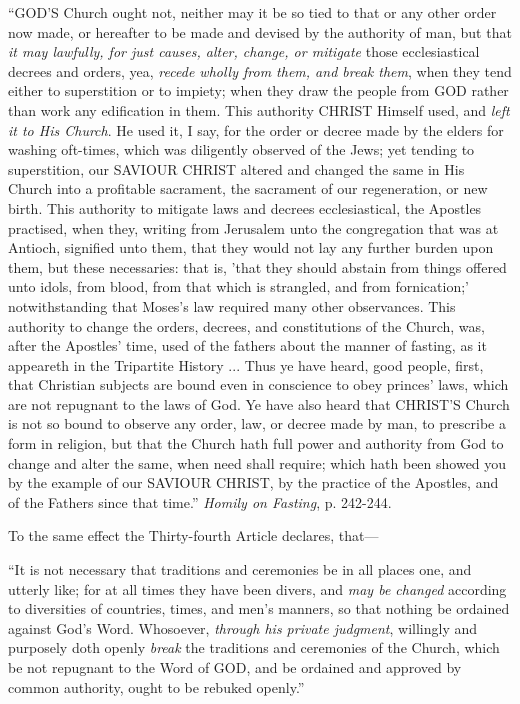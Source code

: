``GOD'S
Church ought not, neither may it be so tied to that or any other order
now made, or hereafter to be made and devised by the authority of man,
but that \emph{it may lawfully, for just causes, alter, change, or
mitigate} those ecclesiastical decrees and orders, yea, \emph{recede
wholly from them, and break them}, when they tend either to
superstition or to impiety; when they draw the people from GOD
rather than work any edification in them. This authority CHRIST
Himself used, and \emph{left it to His Church}. He used it, I say, for
the order or decree made by the elders for washing oft-times, which
was diligently observed of the Jews; yet tending to superstition, our
SAVIOUR CHRIST
altered and changed the same in His Church into a profitable
sacrament, the sacrament of our regeneration, or new birth. This
authority to mitigate laws and decrees ecclesiastical, the Apostles
practised, when they, writing from Jerusalem unto the congregation
that was at Antioch, signified unto them, that they would not lay any
further burden upon them, but these necessaries: that is, 'that they
should abstain from things offered unto idols, from blood, from that
which is strangled, and from fornication;' notwithstanding that Moses's
law required many other observances. This authority to change the
orders, decrees, and constitutions of the Church, was, after the
Apostles' time, used of the fathers about the manner of fasting, as it
appeareth in the Tripartite History ... Thus ye have heard, good
people, first, that Christian subjects are bound even in conscience to
obey princes' laws, which are not repugnant to the laws of God. Ye
have also heard that CHRIST'S
Church is not so bound to observe any order, law, or decree made by
man, to prescribe a form in religion, but that the Church hath
full power and authority from God to change and alter the same, when
need shall require; which hath been showed you by the example of our SAVIOUR
CHRIST, by the practice of
the Apostles, and of the Fathers since that time.'' \emph{Homily on
Fasting}, p. 242-244.

To the same effect the Thirty-fourth Article declares, that—

``It is not necessary that traditions and
ceremonies be in all places one, and utterly like; for at all times
they have been divers, and \emph{may be changed} according to
diversities of countries, times, and men's manners, so that nothing be
ordained against God's Word. Whosoever, \emph{through his private
judgment}, willingly and purposely doth openly \emph{break} the
traditions and ceremonies of the Church, which be not repugnant to the
Word of GOD, and be
ordained and approved by common authority, ought to be rebuked
openly.''

